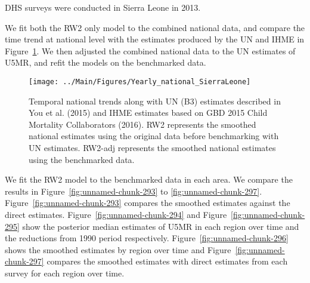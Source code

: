 \documentclass[12pt]{article}\usepackage[]{graphicx}\usepackage[]{color}
\newenvironment{knitrout}{}{} %
\begin{document}


DHS surveys were conducted in Sierra Leone in 2013.

We fit both the RW2 only model to the combined national data, and compare the time trend at national level with the estimates produced by the UN and IHME in Figure~\ref{fig:unnamed-chunk-292}. We then adjusted the combined national data to the UN estimates of U5MR, and refit the models on the benchmarked data. 

\begin{knitrout}
\color{fgcolor}\begin{figure}[bht]

{\centering \texttt{[image: ../Main/Figures/Yearly\_national\_SierraLeone]} 

}

\caption[Temporal national trends along with UN (B3) estimates described in You et al]{Temporal national trends along with UN (B3) estimates described in You et al. (2015) and IHME estimates based on GBD 2015 Child Mortality Collaborators (2016). RW2 represents the smoothed national estimates using the original data before benchmarking with UN estimates. RW2-adj represents the smoothed national estimates using the benchmarked data.}\label{fig:unnamed-chunk-292}
\end{figure}


\end{knitrout}
 

We fit the RW2 model to the benchmarked data in each area. 
We compare the results in Figure~\ref{fig:unnamed-chunk-293} to \ref{fig:unnamed-chunk-297}.
Figure~\ref{fig:unnamed-chunk-293} compares the smoothed estimates against the direct estimates. Figure~\ref{fig:unnamed-chunk-294} and Figure~\ref{fig:unnamed-chunk-295} show the posterior median estimates of U5MR in each region over time and the reductions from 1990 period respectively.
Figure~\ref{fig:unnamed-chunk-296} shows the smoothed estimates by region over time and Figure~\ref{fig:unnamed-chunk-297} compares the smoothed estimates with direct estimates from each survey for each region over time.


\end{document}
